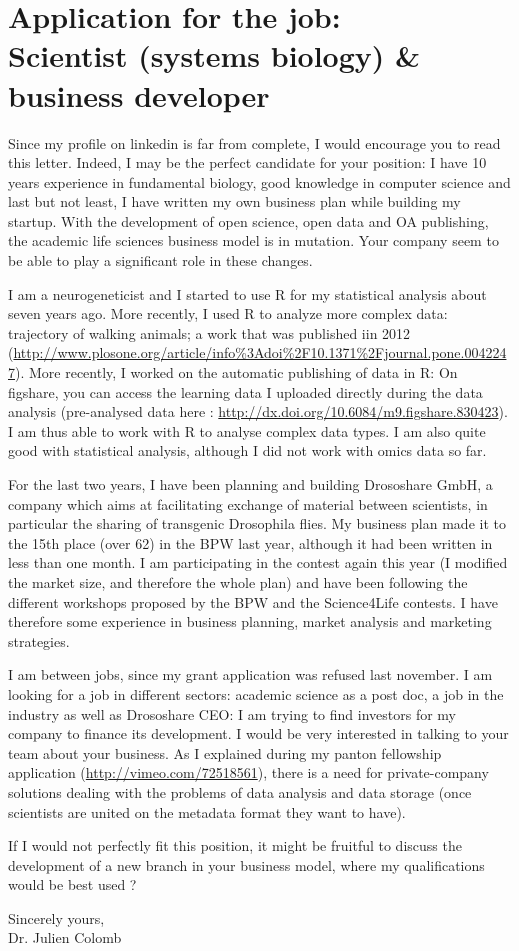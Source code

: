 
\section* {Application for the job: \\Scientist (systems biology) \& business developer}

\vspace{1cm}

Since my profile on linkedin is far from complete, I would encourage you to read this letter. Indeed, I may be the perfect candidate for your position: I have 10 years experience in fundamental biology, good knowledge in computer science and last but not least, I have written my own business plan while building my startup. With the development of open science, open data and OA publishing, the academic life sciences business model is in mutation. Your company seem to be able to play a significant role in these changes.

I am a neurogeneticist and I started to use R for my statistical analysis about seven years ago. More recently, I used R to analyze more complex data: trajectory of walking animals; a work that was published iin 2012 (\url{http://www.plosone.org/article/info%3Adoi%2F10.1371%2Fjournal.pone.0042247}).
More recently, I worked on the automatic publishing of data in R: On figshare, you can access the learning data I uploaded directly during the data analysis (pre-analysed data here : \url{http://dx.doi.org/10.6084/m9.figshare.830423}). I am thus able to work with R to analyse complex data types. I am also quite good with statistical analysis, although I did not work with omics data so far.

For the last two years, I have been planning and building Drososhare GmbH, a company which aims at facilitating exchange of material between scientists, in particular the sharing of transgenic Drosophila flies. My business plan made it to the 15th place (over 62) in the BPW last year, although it had been written in less than one month. I am participating in the contest again this year (I modified the market size, and therefore the whole plan) and have been following the different workshops proposed by the BPW and the Science4Life contests. I have therefore some experience in business planning, market analysis and marketing strategies.

I am between jobs, since my grant application was refused last november. I am looking for a job in different sectors: academic science as a post doc, a job in the industry as well as Drososhare CEO: I am trying to find investors for my company to finance its development. I would be very interested in talking to your team about your business. As I explained during my panton fellowship application (\url{http://vimeo.com/72518561}), there is a need for private-company solutions dealing with the problems of data analysis and data storage (once scientists are united on the metadata format they want to have). 

If I would not perfectly fit this position, it might be fruitful to discuss the development of a new branch in your business model, where my qualifications would be best used ?


\vspace{1cm}
Sincerely yours,
\\

\hspace{0.6\textwidth} Dr. Julien Colomb


